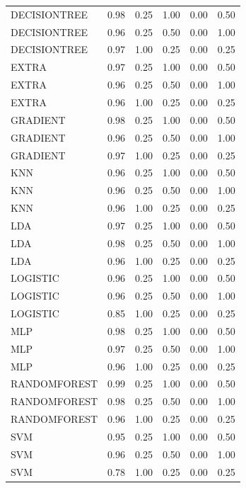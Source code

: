 \documentclass[letterpaper]{article}
\begin{document}
{\begin{tiny}
\begin{longtable}{lcrrrr}
\bottomrule
\endlastfoot
DECISIONTREE & 0.98 &      0.25 & 1.00 &       0.00 &       0.50 \\
DECISIONTREE & 0.96 &      0.25 & 0.50 &       0.00 &       1.00 \\
DECISIONTREE & 0.97 &      1.00 & 0.25 &       0.00 &       0.25 \\
       EXTRA & 0.97 &      0.25 & 1.00 &       0.00 &       0.50 \\
       EXTRA & 0.96 &      0.25 & 0.50 &       0.00 &       1.00 \\
       EXTRA & 0.96 &      1.00 & 0.25 &       0.00 &       0.25 \\
    GRADIENT & 0.98 &      0.25 & 1.00 &       0.00 &       0.50 \\
    GRADIENT & 0.96 &      0.25 & 0.50 &       0.00 &       1.00 \\
    GRADIENT & 0.97 &      1.00 & 0.25 &       0.00 &       0.25 \\
         KNN & 0.96 &      0.25 & 1.00 &       0.00 &       0.50 \\
         KNN & 0.96 &      0.25 & 0.50 &       0.00 &       1.00 \\
         KNN & 0.96 &      1.00 & 0.25 &       0.00 &       0.25 \\
         LDA & 0.97 &      0.25 & 1.00 &       0.00 &       0.50 \\
         LDA & 0.98 &      0.25 & 0.50 &       0.00 &       1.00 \\
         LDA & 0.96 &      1.00 & 0.25 &       0.00 &       0.25 \\
    LOGISTIC & 0.96 &      0.25 & 1.00 &       0.00 &       0.50 \\
    LOGISTIC & 0.96 &      0.25 & 0.50 &       0.00 &       1.00 \\
    LOGISTIC & 0.85 &      1.00 & 0.25 &       0.00 &       0.25 \\
         MLP & 0.98 &      0.25 & 1.00 &       0.00 &       0.50 \\
         MLP & 0.97 &      0.25 & 0.50 &       0.00 &       1.00 \\
         MLP & 0.96 &      1.00 & 0.25 &       0.00 &       0.25 \\
RANDOMFOREST & 0.99 &      0.25 & 1.00 &       0.00 &       0.50 \\
RANDOMFOREST & 0.98 &      0.25 & 0.50 &       0.00 &       1.00 \\
RANDOMFOREST & 0.96 &      1.00 & 0.25 &       0.00 &       0.25 \\
         SVM & 0.95 &      0.25 & 1.00 &       0.00 &       0.50 \\
         SVM & 0.96 &      0.25 & 0.50 &       0.00 &       1.00 \\
         SVM & 0.78 &      1.00 & 0.25 &       0.00 &       0.25 \\




\end{longtable}
\end{tiny}}
\end{document}
